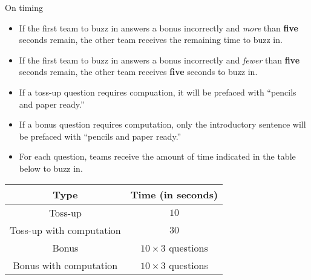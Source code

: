 \documentclass{report}
\begin{document}
\vspace*{0.3 cm}
On timing
\begin{itemize}
    \item If the first team to buzz in answers a bonus incorrectly and \textit{more} than \textbf{five} seconds remain, the other team receives the remaining time to buzz in.
    \item If the first team to buzz in answers a bonus incorrectly and \textit{fewer} than \textbf{five} seconds remain, the other team receives \textbf{five} seconds to buzz in.
    \item If a toss-up question requires compuation, it will be prefaced with ``pencils and paper ready.''
    \item If a bonus question requires computation, only the introductory sentence will be prefaced with ``pencils and paper ready.''
    \item For each question, teams receive the amount of time indicated in the table below to buzz in.

\end{itemize}

\vspace*{\fill}

\begin{center}
\begin{tabular}{||c|c||} 
    \hline
    Type & Time (in seconds) \\
    \hline\hline
    Toss-up & $10$ \\ 
    \hline
    Toss-up with computation & $30$ \\ 
    \hline
    Bonus & $10\times 3$ questions \\ 
    \hline
    Bonus with computation & $10\times 3$ questions \\
    \hline
\end{tabular}
\end{center}
\end{document}
